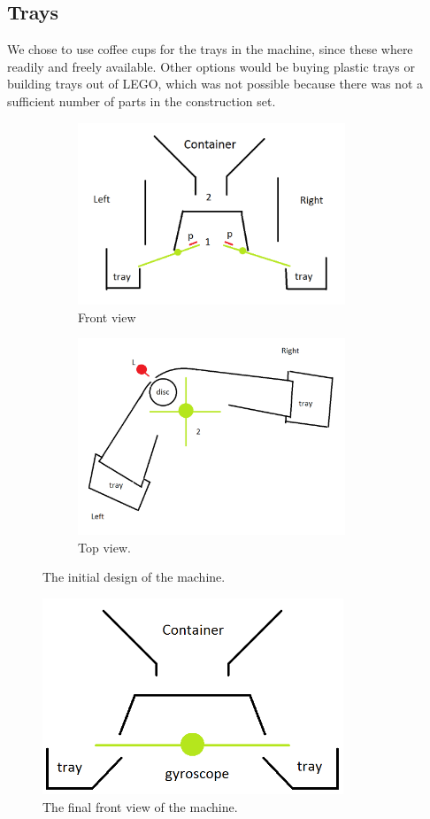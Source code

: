 \documentclass[a4paper,oneside,11pt]{article}
\begin{document}
\subsection{Trays}
We chose to use coffee cups for the trays in the machine, since these where readily and freely available. Other options would be buying plastic trays or building trays out of LEGO, which was not possible because there was not a sufficient number of parts in the construction set.

\begin{figure}[H]
\begin{subfigure}{0.5\textwidth}
	\centering
	\includegraphics[width=80mm]{front.png}
	\caption{\label{firstfront}Front view}	
\end{subfigure}	
\begin{subfigure}{0.5\textwidth}
\centering
	\includegraphics[width=80mm]{top.png}
	\caption{\label{top}Top view.}
\end{subfigure}	
\caption{The initial design of the machine.}
\end{figure}

\begin{figure}[H]
	\centering
	\includegraphics[width=90mm]{frontnew.png}
	\caption{\label{front}The final front view of the machine.}
\end{figure}
\end{document}
